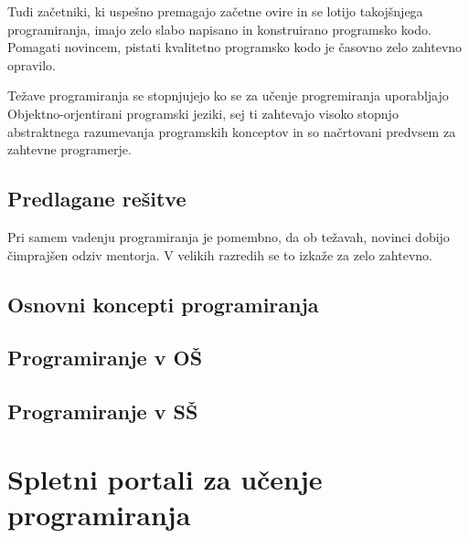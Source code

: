 Tudi začetniki, ki uspešno premagajo začetne ovire in se lotijo
takojšnjega programiranja, imajo zelo slabo napisano in konstruirano
programsko kodo. Pomagati novincem, pistati kvalitetno programsko kodo
je časovno zelo zahtevno opravilo.

Težave programiranja se stopnjujejo ko se za učenje progremiranja
uporabljajo Objektno-orjentirani programski jeziki, sej ti zahtevajo
visoko stopnjo abstraktnega razumevanja programskih konceptov in so
načrtovani predvsem za zahtevne programerje.


\subsection{Predlagane rešitve}
\label{sec:predlagane_resitve}

Pri samem vadenju programiranja je pomembno, da ob težavah, novinci
dobijo čimprajšen odziv mentorja. V velikih razredih se to izkaže za
zelo zahtevno.


\subsection{Osnovni koncepti programiranja}
\label{sec:Osnvni koncepti_programiranja}

\subsection{Programiranje v OŠ}
\label{sec:Programiranje_v_OŠ}

\subsection{Programiranje v SŠ}
\label{sec:Programiranje_v_SŠ}


\section{Spletni portali za učenje programiranja}
\label{sec:SPUP}


